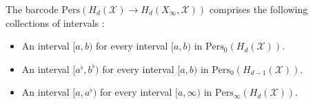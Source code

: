 \begin{corollary}
The barcode $\mathrm{Pers}(H_{d}(\mathcal{X}) \rightarrow H_{d}(X_{\infty}, \mathcal{X}))$ comprises the following collections of intervals \cite[Proposition 2.5]{de2011dualities}:
\begin{itemize}
    \item An interval $[a, b)$ for every interval $[a, b)$ in $\mathrm{Pers}_{0}(H_{d}(\mathcal{X}))$.
    \item An interval $[a^{\flat}, b^{\flat})$ for every interval $[a, b)$ in $\mathrm{Pers}_{0}(H_{d-1}(\mathcal{X}))$.
    \item An interval $[a, a^{\flat})$ for every interval $[a, \infty)$ in $\mathrm{Pers}_{\infty}(H_{d}(\mathcal{X}))$.
\end{itemize}
\end{corollary}

